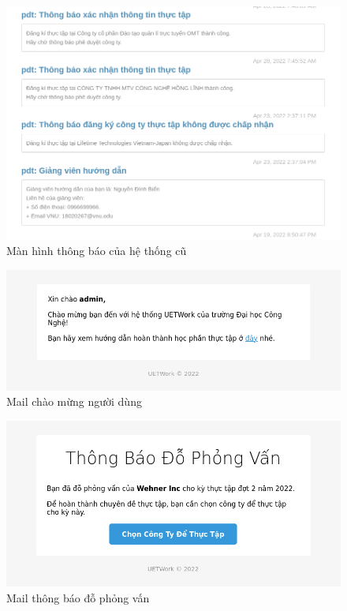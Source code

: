 \documentclass[./../main.tex]{subfiles}
\begin{document}
\begin{figure}[]
	\includegraphics[width=\linewidth]{./images/notification_old.png}
	\caption{Màn hình thông báo của hệ thống cũ}
	\label{fig:old_notification_page}
\end{figure}

\begin{figure}
	\includegraphics[width=\linewidth]{./images/mail_screenshot.png}
	\caption{Mail chào mừng người dùng}
	\label{fig:welcome_mail}
\end{figure}

\begin{figure}
	\includegraphics[width=\linewidth]{./images/complex_mail_screenshot.png}
	\caption{Mail thông báo đỗ phỏng vấn}
	\label{fig:pass_mail}
\end{figure}
\end{document}
